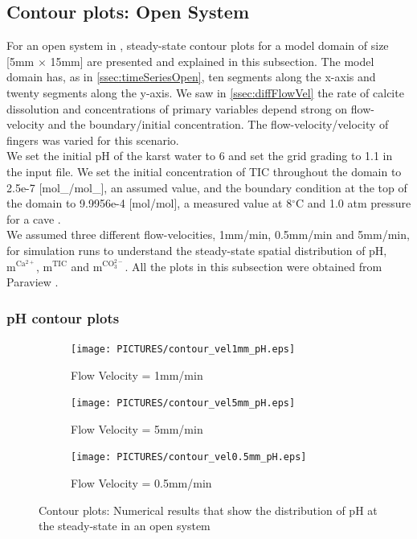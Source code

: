 \subsection{Contour plots: Open System} \label{ssec:contour}
For an open system in \DuMuX, steady-state contour plots for a model domain of size [5mm $\times$ 15mm] are presented and explained in this subsection.
The model domain has, as in \ref{ssec:timeSeriesOpen}, ten segments along the x-axis and twenty segments along the y-axis. We saw in \ref{ssec:diffFlowVel}
the rate of calcite dissolution and concentrations of primary variables depend strong on flow-velocity and the boundary/initial  concentration. 
The flow-velocity/velocity of  fingers was varied for this scenario. \\
We set the initial pH of the karst water to 6 and set the grid grading to 1.1 in the input file. 
We set the initial concentration of TIC throughout the domain to 2.5e-7 [mol\_/mol\_], an assumed value, and the 
boundary condition at the top of the domain to 9.9956e-4 [mol/mol], a measured value at 8$^{\circ}$C and 1.0 atm pressure for a cave \cite{Class2020}. \\
We assumed three different flow-velocities, 1mm/min, 0.5mm/min and 5mm/min, for simulation runs to understand the steady-state spatial distribution of 
pH, $\mathrm{m^{Ca^{2+}}}$, $\mathrm{m^{TIC}}$ and $\mathrm{m^{CO_3^{2-}}}$. 
All the plots in this subsection were obtained from Paraview \cite{ahrens2005paraview}.

\subsubsection*{pH contour plots} \label{sssec:contourpH}

\begin{figure}[!h]
\centering
    \begin{subfigure}{.5\linewidth}
        \centering
        \texttt{[image: PICTURES/contour\_vel1mm\_pH.eps]}
        \caption{Flow Velocity = 1mm/min}
        \label{fig:pHSteady-state}       %
    \end{subfigure}%
    \hfill
    \begin{subfigure}{.5\linewidth}
        \centering
        \texttt{[image: PICTURES/contour\_vel5mm\_pH.eps]}
        \caption{Flow Velocity = 5mm/min}
        \label{fig:pHSteady-state5mm}       %
    \end{subfigure}%
    \hfill
    \begin{subfigure}{.5\linewidth}
        \centering
        \texttt{[image: PICTURES/contour\_vel0.5mm\_pH.eps]}
        \caption{Flow Velocity = 0.5mm/min}
        \label{fig:pHSteady-state0.5mm}       %
    \end{subfigure}%
    \caption{\DuMuX Contour plots: Numerical results that show the distribution of pH at the steady-state in an open system}
     \label{fig:contourpH}
\end{figure}

